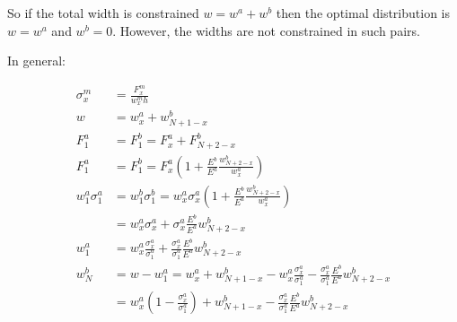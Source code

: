 So if the total width is constrained $w = w^a + w^b$ then the optimal distribution is $w = w^a$ and $w^b=0$.
However, the widths are not constrained in such pairs.

In general:

\begin{align*}
    \sigma_x^m &= \frac{F_x^m}{w_x^m h}\\
    w &= w_x^a + w_{N+1-x}^b \\
    F_1^a &= F_1^b = F_x^a + F_{N+2-x}^b \\
    F_1^a &= F_1^b %
     = F_x^a \left( 1 + \frac{E^b}{E^a} \frac{w^b_{N+2-x}}{w^a_x} \right) \\
    w_1^a \sigma_1^a &= w_1^b \sigma_1^b = w_x^a \sigma_x^a \left( 1 + \frac{E^b}{E^a} \frac{w^b_{N+2-x}}{w^a_x} \right) \\
    &= w_x^a \sigma_x^a + \sigma_x^a \frac{E^b}{E^a} w^b_{N+2-x} \\
    w_1^a &= w_x^a \frac{\sigma_x^a}{\sigma_1^a} + \frac{\sigma_x^a}{\sigma_1^a} \frac{E^b}{E^a} w^b_{N+2-x} \\
    w_N^b &= w - w_1^a =  w_x^a + w_{N+1-x}^b  -  w_x^a \frac{\sigma_x^a}{\sigma_1^a} - \frac{\sigma_x^a}{\sigma_1^a} \frac{E^b}{E^a} w^b_{N+2-x} \\
    &= w_x^a \left( 1 - \frac{\sigma_x^a}{\sigma_1^a} \right) + w_{N+1-x}^b - \frac{\sigma_x^a}{\sigma_1^a} \frac{E^b}{E^a} w^b_{N+2-x} \\
\end{align*}

